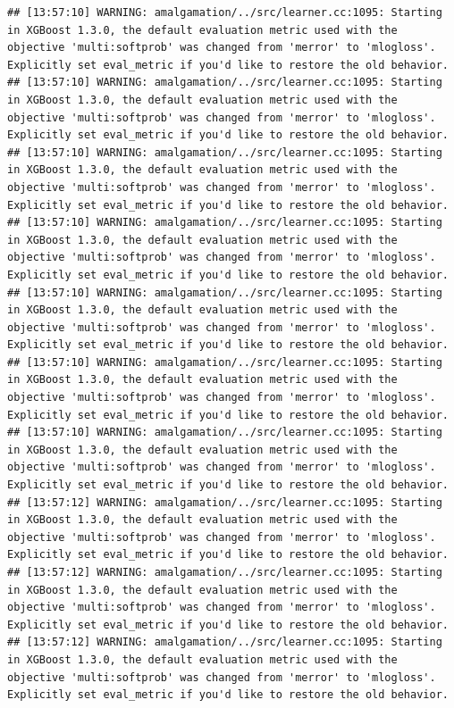 \documentclass[
]{scrbook}
\begin{document}
\begin{verbatim}
## [13:57:10] WARNING: amalgamation/../src/learner.cc:1095: Starting in XGBoost 1.3.0, the default evaluation metric used with the objective 'multi:softprob' was changed from 'merror' to 'mlogloss'. Explicitly set eval_metric if you'd like to restore the old behavior.
## [13:57:10] WARNING: amalgamation/../src/learner.cc:1095: Starting in XGBoost 1.3.0, the default evaluation metric used with the objective 'multi:softprob' was changed from 'merror' to 'mlogloss'. Explicitly set eval_metric if you'd like to restore the old behavior.
## [13:57:10] WARNING: amalgamation/../src/learner.cc:1095: Starting in XGBoost 1.3.0, the default evaluation metric used with the objective 'multi:softprob' was changed from 'merror' to 'mlogloss'. Explicitly set eval_metric if you'd like to restore the old behavior.
## [13:57:10] WARNING: amalgamation/../src/learner.cc:1095: Starting in XGBoost 1.3.0, the default evaluation metric used with the objective 'multi:softprob' was changed from 'merror' to 'mlogloss'. Explicitly set eval_metric if you'd like to restore the old behavior.
## [13:57:10] WARNING: amalgamation/../src/learner.cc:1095: Starting in XGBoost 1.3.0, the default evaluation metric used with the objective 'multi:softprob' was changed from 'merror' to 'mlogloss'. Explicitly set eval_metric if you'd like to restore the old behavior.
## [13:57:10] WARNING: amalgamation/../src/learner.cc:1095: Starting in XGBoost 1.3.0, the default evaluation metric used with the objective 'multi:softprob' was changed from 'merror' to 'mlogloss'. Explicitly set eval_metric if you'd like to restore the old behavior.
## [13:57:10] WARNING: amalgamation/../src/learner.cc:1095: Starting in XGBoost 1.3.0, the default evaluation metric used with the objective 'multi:softprob' was changed from 'merror' to 'mlogloss'. Explicitly set eval_metric if you'd like to restore the old behavior.
## [13:57:12] WARNING: amalgamation/../src/learner.cc:1095: Starting in XGBoost 1.3.0, the default evaluation metric used with the objective 'multi:softprob' was changed from 'merror' to 'mlogloss'. Explicitly set eval_metric if you'd like to restore the old behavior.
## [13:57:12] WARNING: amalgamation/../src/learner.cc:1095: Starting in XGBoost 1.3.0, the default evaluation metric used with the objective 'multi:softprob' was changed from 'merror' to 'mlogloss'. Explicitly set eval_metric if you'd like to restore the old behavior.
## [13:57:12] WARNING: amalgamation/../src/learner.cc:1095: Starting in XGBoost 1.3.0, the default evaluation metric used with the objective 'multi:softprob' was changed from 'merror' to 'mlogloss'. Explicitly set eval_metric if you'd like to restore the old behavior.

\end{verbatim}
\end{document}
